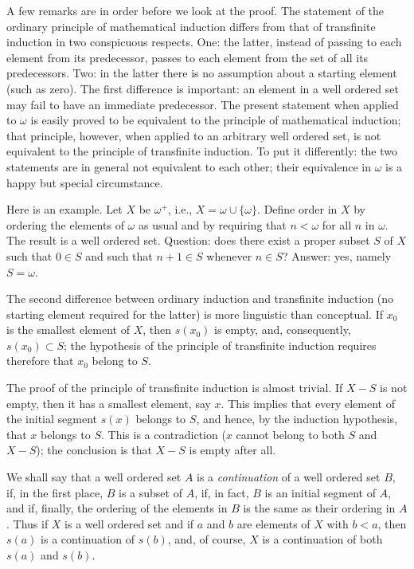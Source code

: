 A few remarks are in order before we look at the proof. The statement of the ordinary principle of mathematical induction differs from that of transfinite induction in two conspicuous respects. One: the latter, instead of passing to each element from its predecessor, passes to each element from the set of all its predecessors. Two: in the latter there is no assumption about a starting element (such as zero). The first difference is important: an element in a well ordered set may fail to have an immediate predecessor. The present statement when applied to $\omega$ is easily proved to be equivalent to the principle of mathematical induction; that principle, however, when applied to an arbitrary well ordered set, is not equivalent to the principle of transfinite induction. To put it differently: the two statements are in general not equivalent to each other; their equivalence in $\omega$ is a happy but special circumstance. 

Here is an example. Let $X$ be $\omega^{+}$, i.e., $X = \omega \cup \{ \omega \}$. Define order in $X$ by ordering the elements of $\omega$ as usual and by requiring that $n < \omega$ for all $n$ in $\omega$. The result is a well ordered set. Question: does there exist a proper subset $S$ of $X$ such that $0 \in S$ and such that $n + 1 \in  S$ whenever $n \in S$? Answer: yes, namely $S = \omega$. 

The second difference between ordinary induction and transfinite induction (no starting element required for the latter) is more linguistic than conceptual. If $x_{0}$ is the smallest element of $X$, then $s(x_{0})$ is empty, and, consequently, $s(x_{0}) \subset S$; the hypothesis of the principle of transfinite induction requires therefore that $x_{0}$ belong to $S$.

The proof of the principle of transfinite induction is almost trivial. If $X - S$ is not empty, then it has a smallest element, say $x$. This implies that every element of the initial segment $s(x)$ belongs to $S$, and hence, by the induction hypothesis, that $x$ belongs to $S$. This is a contradiction ($x$ cannot belong to both $S$ and $X - S$); the conclusion is that $X - S$ is empty after all. 

We shall say that a well ordered set $A$ is a \textit{continuation} of a well ordered set $B$, if, in the first place, $B$ is a subset of $A$, if, in fact, $B$ is an initial segment of $A$, and if, finally, the ordering of the elements in $B$ is the same as their ordering in $A$. Thus if $X$ is a well ordered set and if $a$ and $b$ are elements of $X$ with $b < a$, then $s(a)$ is a continuation of $s(b)$, and, of course, $X$ is a continuation of both $s(a)$ and $s(b)$. 

